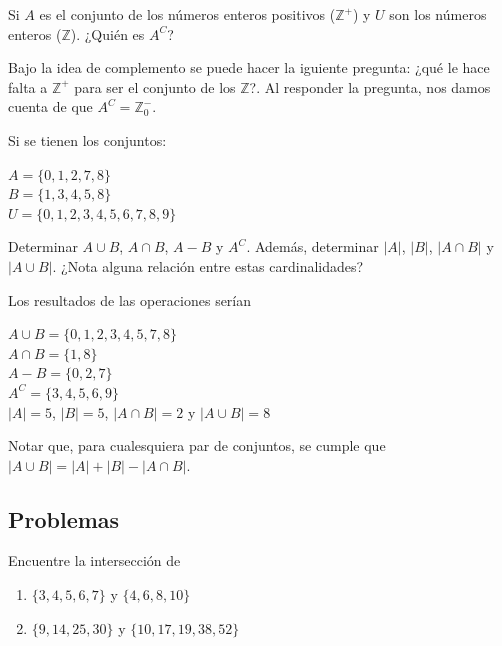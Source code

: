 \documentclass[12pt]{article}
\begin{document}
\begin{ejemplo}
    Si $A$ es el conjunto de los números enteros positivos ($\mathbb{Z}^{+}$) y $U$ son los números enteros ($\mathbb{Z}$). ¿Quién es $A^C$?
\end{ejemplo}

\begin{solucion}
    Bajo la idea de complemento se puede hacer la iguiente pregunta:  ¿qué le hace falta a $\mathbb{Z}^{+}$ para ser el conjunto de los $\mathbb{Z}$?.  Al responder la pregunta, nos damos cuenta de que $A^C=\mathbb{Z}^{-}_{0}$.
\end{solucion}

\begin{ejemplo}
    Si se tienen los conjuntos:

    \begin{center}
        $A =\{0, 1, 2, 7, 8\}$ \\
        $B =\{1, 3, 4, 5, 8\}$ \\
        $U =\{0, 1, 2, 3, 4, 5, 6, 7, 8, 9\}$
    \end{center}

    Determinar $A \cup B$, $A \cap B$, $A-B$ y $A^C$. Además, determinar $|A|$, $|B|$, $|A \cap B|$ y $|A \cup B|$. ¿Nota alguna relación entre estas cardinalidades?
    
\end{ejemplo}

\begin{solucion} Los resultados de las operaciones serían

    \begin{center}
        $A \cup B=\{0,1,2,3,4,5,7,8\}$ \\
        $A \cap B=\{1,8\}$ \\
        $A-B=\{0,2,7\}$ \\
        $A^C=\{3,4,5,6,9\}$ \\
        $|A|=5$, $|B|=5$, $|A \cap B|=2$ y $|A \cup B|=8$
    \end{center}

    Notar que, para cualesquiera par de conjuntos, se cumple que $|A \cup B| = |A| + |B| - |A \cap B|$.
    
\end{solucion}

\subsection{Problemas}

\begin{problema}
    Encuentre la intersección de
    \renewcommand{\labelenumi}{\alph{enumi})}
    \begin{enumerate}
        \item $\{3,4,5,6,7\}$ y $\{4,6,8,10\}$
        \item $\{9,14,25,30\}$ y $\{10,17,19,38,52\}$
    \end{enumerate}
\end{problema}
\end{document}
